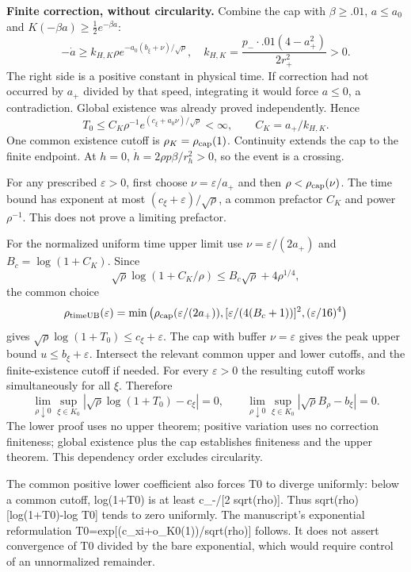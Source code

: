 \documentclass[11pt,a4paper]{article}
\begin{document}
\textbf{Finite correction, without circularity.} Combine the cap with $\beta\ge.01$, $a\le a_0$ and $K(-\beta a)\ge\frac12e^{-\beta a}$:
\[
 -\dot a\ge k_{H,K}\rho e^{-a_0(b_\xi+\nu)/\sqrt\rho},
 \quad k_{H,K}=\frac{p_-\cdot.01(4-a_+^2)}{2r_+^2}>0 .
\]
The right side is a positive constant in physical time. If correction had not occurred by $a_+$ divided by that speed, integrating it would force $a\le0$, a contradiction. Global existence was already proved independently. Hence
\[
 T_0\le C_K\rho^{-1}e^{(c_\xi+a_0\nu)/\sqrt\rho}<\infty,\qquad C_K=a_+/k_{H,K}.
\]
One common existence cutoff is $\rho_K=\rho_{\rm cap}(1)$. Continuity extends the cap to the finite endpoint. At $h=0$, $\dot h=2\rho p\beta/r_h^2>0$, so the event is a crossing.

For any prescribed $\varepsilon>0$, first choose $\nu=\varepsilon/a_+$ and then $\rho<\rho_{\rm cap}(\nu)$. The time bound has exponent at most $(c_\xi+\varepsilon)/\sqrt\rho$, a common prefactor $C_K$ and power $\rho^{-1}$. This does not prove a limiting prefactor.

For the normalized uniform time upper limit use $\nu=\varepsilon/(2a_+)$ and $B_c=\log(1+C_K)$. Since
\[
 \sqrt\rho\log(1+C_K/\rho)\le B_c\sqrt\rho+4\rho^{1/4},
\]
the common choice
\[
 \rho_{\rm timeUB}(\varepsilon)=\min\left(
 \rho_{\rm cap}(\varepsilon/(2a_+)),
 [\varepsilon/(4(B_c+1))]^2,(\varepsilon/16)^4\right)
\]
gives $\sqrt\rho\log(1+T_0)\le c_\xi+\varepsilon$. The cap with buffer $\nu=\varepsilon$ gives the peak upper bound $u\le b_\xi+\varepsilon$. Intersect the relevant common upper and lower cutoffs, and the finite-existence cutoff if needed. For every $\varepsilon>0$ the resulting cutoff works simultaneously for all $\xi$. Therefore
\[
 \lim_{\rho\downarrow0}\sup_{\xi\in K_0}
 |\sqrt\rho\log(1+T_0)-c_\xi|=0,\qquad
 \lim_{\rho\downarrow0}\sup_{\xi\in K_0}|\sqrt\rho B_\rho-b_\xi|=0 .
\]
The lower proof uses no upper theorem; positive variation uses no correction finiteness; global existence plus the cap establishes finiteness and the upper theorem. This dependency order excludes circularity.

The common positive lower coefficient also forces T0 to diverge uniformly: below a common cutoff, log(1+T0) is at least c\_-/[2 sqrt(rho)]. Thus sqrt(rho)[log(1+T0)-log T0] tends to zero uniformly. The manuscript's exponential reformulation T0=exp[(c\_xi+o\_K0(1))/sqrt(rho)] follows. It does not assert convergence of T0 divided by the bare exponential, which would require control of an unnormalized remainder.
\end{document}
